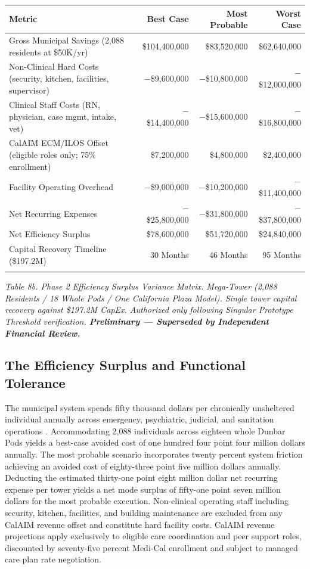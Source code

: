 \documentclass[12pt, letterpaper]{article}
\begin{document}
{\singlespacing
\begin{tabularx}{\textwidth}{@{}lrrr@{}}
\toprule
\rowcolor{rowgray}
Metric & Best Case & Most Probable & Worst Case \\
\midrule
Gross Municipal Savings (2,088 residents at \$50K/yr) & \$104,400,000 & \$83,520,000 & \$62,640,000 \\
\rowcolor{rowgray}
Non-Clinical Hard Costs (security, kitchen, facilities, supervisor) & $-$\$9,600,000 & $-$\$10,800,000 & $-$\$12,000,000 \\
Clinical Staff Costs (RN, physician, case mgmt, intake, vet) & $-$\$14,400,000 & $-$\$15,600,000 & $-$\$16,800,000 \\
\rowcolor{rowgray}
CalAIM ECM/ILOS Offset (eligible roles only; 75\% enrollment) & \$7,200,000 & \$4,800,000 & \$2,400,000 \\
Facility Operating Overhead & $-$\$9,000,000 & $-$\$10,200,000 & $-$\$11,400,000 \\
\rowcolor{rowgray}
Net Recurring Expenses & $-$\$25,800,000 & $-$\$31,800,000 & $-$\$37,800,000 \\
Net Efficiency Surplus & \$78,600,000 & \$51,720,000 & \$24,840,000 \\
\rowcolor{rowgray}
Capital Recovery Timeline (\$197.2M) & 30 Months & 46 Months & 95 Months \\
\addlinespace[4pt]
\bottomrule
\end{tabularx}\par
\vspace{8pt}
\noindent\textit{Table 8b. Phase 2 Efficiency Surplus Variance Matrix. Mega-Tower (2,088 Residents / 18 Whole Pods / One California Plaza Model). Single tower capital recovery against \$197.2M CapEx. Authorized only following Singular Prototype Threshold verification. \textbf{Preliminary --- Superseded by Independent Financial Review.}}
\par}

\subsection{The Efficiency Surplus and Functional Tolerance}

The municipal system spends fifty thousand dollars per chronically unsheltered individual annually across emergency, psychiatric, judicial, and sanitation operations \citep{calmatters_2026}. Accommodating 2,088 individuals across eighteen whole Dunbar Pods yields a best-case avoided cost of one hundred four point four million dollars annually. The most probable scenario incorporates twenty percent system friction achieving an avoided cost of eighty-three point five million dollars annually. Deducting the estimated thirty-one point eight million dollar net recurring expense per tower yields a net mode surplus of fifty-one point seven million dollars for the most probable execution. Non-clinical operating staff including security, kitchen, facilities, and building maintenance are excluded from any CalAIM revenue offset and constitute hard facility costs. CalAIM revenue projections apply exclusively to eligible care coordination and peer support roles, discounted by seventy-five percent Medi-Cal enrollment and subject to managed care plan rate negotiation.
\end{document}
